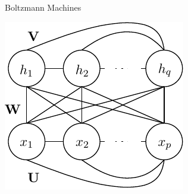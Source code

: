 \documentclass{beamer}
\begin{document}
\begin{frame}{Boltzmann Machines}

    \begin{minipage}{0.33\textwidth}
        \begin{minipage}{\columnwidth}
            \centering
            \includegraphics[width=0.99\columnwidth]{boltzmann.pdf}
        \end{minipage}
        
        \vspace{3mm}


\end{minipage}
\end{frame}
\end{document}
